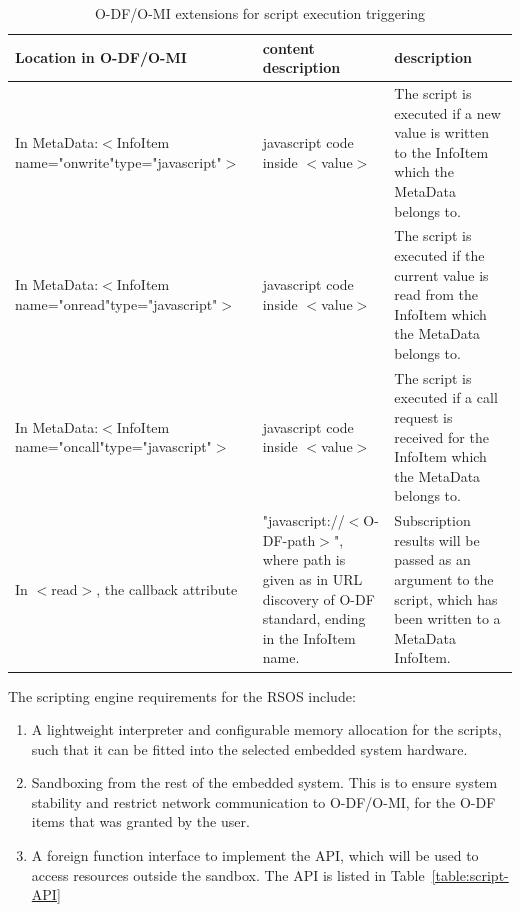 \begin{table}[H]
  \centering
  \caption{O-DF/O-MI extensions for script execution triggering}
  \label{table:triggers}
  \selectfont %
  \scriptsize
  \begin{tabular}{|p{}|p{}|p{}|} \hline
    Location in O-DF/O-MI & content description & description \\ \hline
    In MetaData:\newline $<$InfoItem name="onwrite"\newline type="javascript"$>$ & javascript code inside $<$value$>$ & The script is executed if a new value is written to the InfoItem which the MetaData belongs to. \\ \hline
    In MetaData:\newline $<$InfoItem name="onread"\newline type="javascript"$>$ & javascript code inside $<$value$>$ & The script is executed if the current value is read from the InfoItem which the MetaData belongs to. \\ \hline
    In MetaData:\newline $<$InfoItem name="oncall"\newline type="javascript"$>$ & javascript code inside $<$value$>$ & The script is executed if a call request is received for the InfoItem which the MetaData belongs to. \\ \hline
    In $<$read$>$, the callback attribute & "javascript://$<$O-DF-path$>$", where path is given as in URL discovery of O-DF standard, ending in the InfoItem name.  & Subscription results will be passed as an argument to the script, which has been written to a MetaData InfoItem. \\ \hline
  \end{tabular}
\end{table}

The scripting engine requirements for the RSOS include:

\begin{enumerate}
  \item A lightweight interpreter and configurable memory allocation for the scripts, such that it can be fitted into the selected embedded system hardware.
  \item Sandboxing from the rest of the embedded system. This is to ensure system stability and restrict network communication to O-DF/O-MI, for the O-DF items that was granted by the user.
  \item A foreign function interface to implement the API, which will be used to access resources outside the sandbox. The API is listed in Table~\ref{table:script-API}
\end{enumerate}

